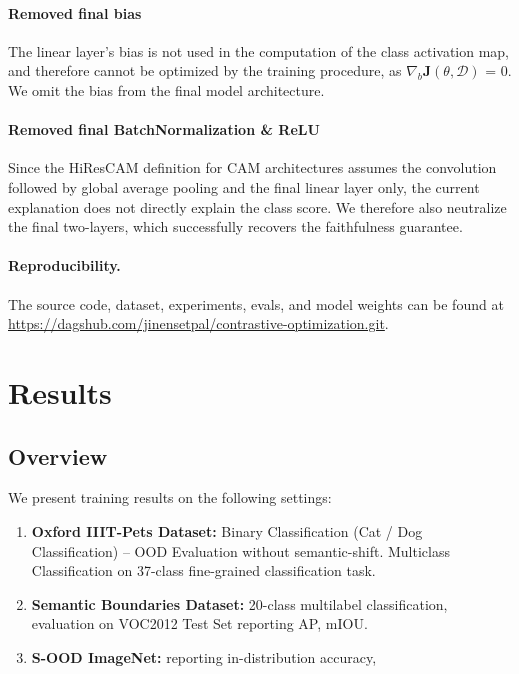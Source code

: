 \documentclass{article}
\theoremstyle{plain}
\theoremstyle{definition}
\theoremstyle{remark}
\begin{document}
\paragraph{Removed final bias} The linear layer's bias is not used in the computation of the class activation map, and therefore cannot be optimized by the training procedure, as $\nabla_b \mathcal{\bm{J}}(\theta, \mathcal{D})$ = 0. We omit the bias from the final model architecture.

\paragraph{Removed final BatchNormalization \& ReLU} Since the HiResCAM definition for CAM architectures assumes the convolution followed by global average pooling and the final linear layer only, the current explanation does not directly explain the class score. We therefore also neutralize the final two-layers, which successfully recovers the faithfulness guarantee.

\paragraph{Reproducibility.} The source code, dataset, experiments, evals, and model weights can be found at \url{https://dagshub.com/jinensetpal/contrastive-optimization.git}.

\section{Results}

\subsection{Overview}

We present training results on the following settings:
\begin{enumerate}
	\item \textbf{Oxford IIIT-Pets Dataset:} Binary Classification (Cat / Dog Classification) -- OOD Evaluation without semantic-shift. Multiclass Classification on 37-class fine-grained classification task.
	\item \textbf{Semantic Boundaries Dataset:} 20-class multilabel classification, evaluation on VOC2012 Test Set reporting AP, mIOU.
	\item \textbf{S-OOD ImageNet:} reporting in-distribution accuracy, 
\end{enumerate}
\end{document}
